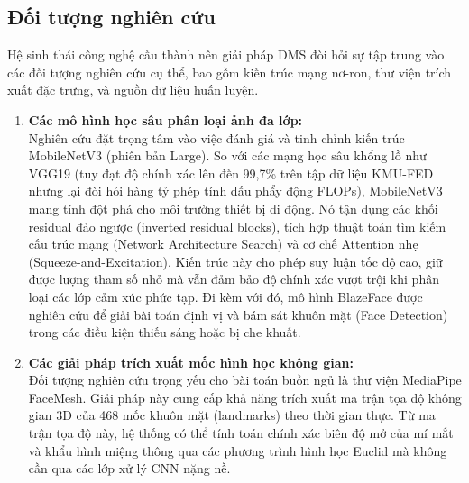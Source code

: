 \documentclass[../DoAn.tex]{subfiles}
\begin{document}
\subsection{Đối tượng nghiên cứu}
Hệ sinh thái công nghệ cấu thành nên giải pháp DMS đòi hỏi sự tập trung vào các đối tượng nghiên cứu cụ thể, bao gồm kiến trúc mạng nơ-ron, thư viện trích xuất đặc trưng, và nguồn dữ liệu huấn luyện.
\begin{enumerate}
    \item \textbf{Các mô hình học sâu phân loại ảnh đa lớp:}\\
    Nghiên cứu đặt trọng tâm vào việc đánh giá và tinh chỉnh kiến trúc MobileNetV3 (phiên bản Large). So với các mạng học sâu khổng lồ như VGG19 (tuy đạt độ chính xác lên đến 99,7\% trên tập dữ liệu KMU-FED nhưng lại đòi hỏi hàng tỷ phép tính dấu phẩy động FLOPs), MobileNetV3 mang tính đột phá cho môi trường thiết bị di động. Nó tận dụng các khối residual đảo ngược (inverted residual blocks), tích hợp thuật toán tìm kiếm cấu trúc mạng (Network Architecture Search) và cơ chế Attention nhẹ (Squeeze-and-Excitation). Kiến trúc này cho phép suy luận tốc độ cao, giữ được lượng tham số nhỏ mà vẫn đảm bảo độ chính xác vượt trội khi phân loại các lớp cảm xúc phức tạp. Đi kèm với đó, mô hình BlazeFace được nghiên cứu để giải bài toán định vị và bám sát khuôn mặt (Face Detection) trong các điều kiện thiếu sáng hoặc bị che khuất.
    
    \item \textbf{Các giải pháp trích xuất mốc hình học không gian:}\\
    Đối tượng nghiên cứu trọng yếu cho bài toán buồn ngủ là thư viện MediaPipe FaceMesh. Giải pháp này cung cấp khả năng trích xuất ma trận tọa độ không gian 3D của 468 mốc khuôn mặt (landmarks) theo thời gian thực. Từ ma trận tọa độ này, hệ thống có thể tính toán chính xác biên độ mở của mí mắt và khẩu hình miệng thông qua các phương trình hình học Euclid mà không cần qua các lớp xử lý CNN nặng nề.
    

\end{enumerate}
\end{document}
